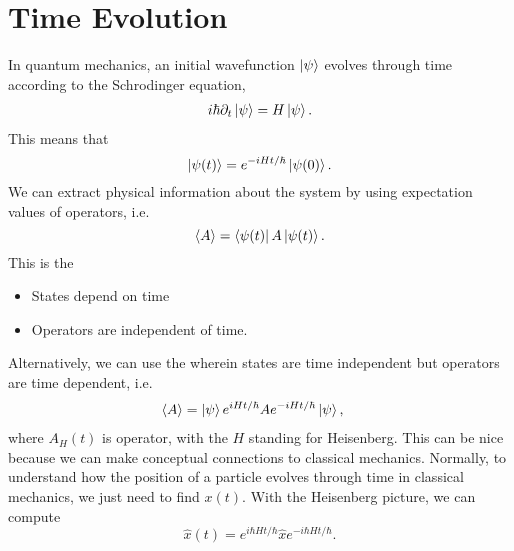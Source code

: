 \documentclass{article}
\numberwithin{equation}{section}
\begin{document}
\section{Time Evolution}
In quantum mechanics, an initial wavefunction $\ket{\psi}$ evolves through time according to the Schrodinger equation,
\begin{align*}
    i\hbar\partial_t\ket{\psi} = H\ket{\psi}.
\end{align*}
This means that 
\begin{equation*}
    \ket{\psi(t)} = e^{-iHt/\hbar}\ket{\psi(0)}.
\end{equation*}
We can extract physical information about the system by using expectation values of operators, i.e. 
\begin{equation*}
    \langle A\rangle = \bra{\psi(t)}A\ket{\psi(t)}.
\end{equation*}
This is the 
\begin{itemize}
    \item States depend on time
    \item Operators are independent of time.
\end{itemize}
Alternatively, we can use the  wherein states are time independent but operators are time dependent, i.e. 
\begin{align*}
    \langle A\rangle &= \ket{\psi}e^{iHt/\hbar}Ae^{-iHt/\hbar}\ket{\psi},
\end{align*}
where $A_H(t)$ is operator, with the $H$ standing for Heisenberg. This can be nice because we can make conceptual connections to classical mechanics. Normally, to understand how the position of a particle evolves through time in classical mechanics, we just need to find $x(t)$. With the Heisenberg picture, we can compute 
\begin{equation*}
    \hat{x}(t) = e^{i\hbar{H}t/\hbar}\hat{x}e^{-i\hbar{H}t/\hbar}.
\end{equation*}
\end{document}
